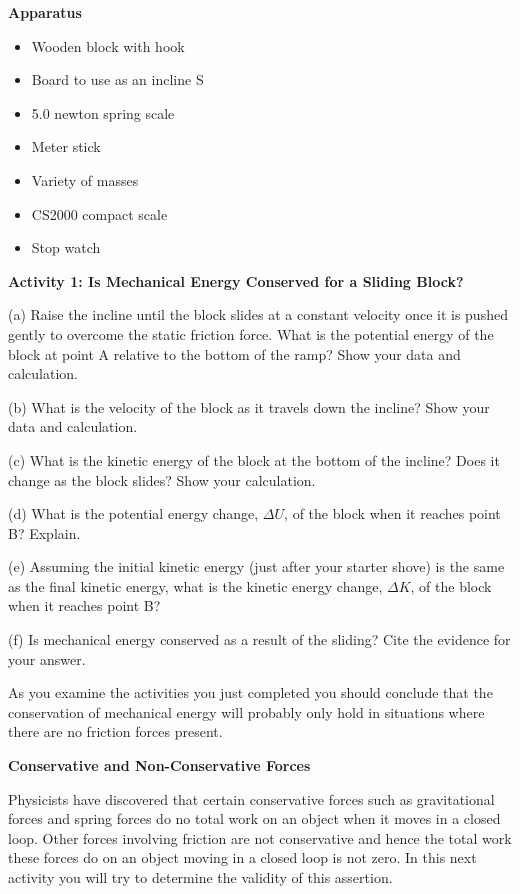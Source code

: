 \textbf{Apparatus} 

\begin{itemize}
\item Wooden block with hook 
\item Board to use as an incline S
\item 5.0 newton spring scale 
\item Meter stick 
\item Variety of masses 
\item CS2000 compact scale
\item Stop watch
\end{itemize}
\textbf{Activity 1: Is Mechanical Energy Conserved for a Sliding Block? }

(a) Raise the incline until the block slides at a constant velocity once it
is pushed gently to overcome the static friction force. What is the potential
energy of the block at point A relative to the bottom of the ramp? Show your
data and calculation.
\answerspace{30mm}

\pagebreak[2]
(b) What is the velocity of the block as it travels down the incline? Show your
data and calculation.
\vspace{20mm}

(c) What is the kinetic energy of the block at the bottom of the incline? Does
it change as the block slides? Show your calculation.
\vspace{20mm}

(d) What is the potential energy change, $\Delta U$, of the block when it reaches point B? Explain.
\vspace{20mm}

(e) Assuming the initial kinetic energy (just after your starter shove) is the
same as the final kinetic energy, what is the kinetic energy change, $\Delta K$, of the block when it reaches point B? 
\vspace{20mm}

(f) Is mechanical energy conserved as a result of the sliding? Cite the evidence for your answer.
\vspace{20mm}

As you examine the activities you just completed you should conclude that the
conservation of mechanical energy will probably only hold in situations where
there are no friction forces present. 

\textbf{Conservative and Non-Conservative Forces} 

Physicists have discovered that certain conservative forces such as gravitational forces and spring forces do no total work on an object when it moves in a closed loop. Other forces involving friction are not conservative and hence the total work these forces do on an object moving in a closed loop is not zero. In this next activity you will try to determine the validity of this assertion.

